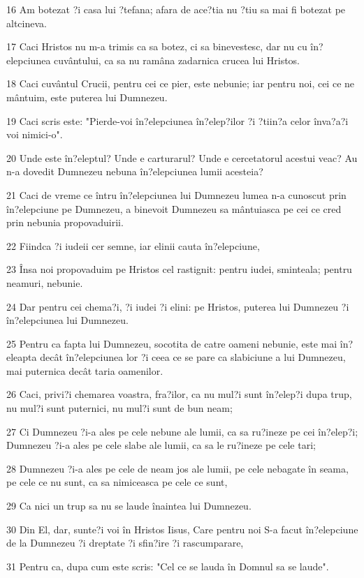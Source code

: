 \par 16 Am botezat ?i casa lui ?tefana; afara de ace?tia nu ?tiu sa mai fi botezat pe altcineva.
\par 17 Caci Hristos nu m-a trimis ca sa botez, ci sa binevestesc, dar nu cu în?elepciunea cuvântului, ca sa nu ramâna zadarnica crucea lui Hristos.
\par 18 Caci cuvântul Crucii, pentru cei ce pier, este nebunie; iar pentru noi, cei ce ne mântuim, este puterea lui Dumnezeu.
\par 19 Caci scris este: "Pierde-voi în?elepciunea în?elep?ilor ?i ?tiin?a celor înva?a?i voi nimici-o".
\par 20 Unde este în?eleptul? Unde e carturarul? Unde e cercetatorul acestui veac? Au n-a dovedit Dumnezeu nebuna în?elepciunea lumii acesteia?
\par 21 Caci de vreme ce întru în?elepciunea lui Dumnezeu lumea n-a cunoscut prin în?elepciune pe Dumnezeu, a binevoit Dumnezeu sa mântuiasca pe cei ce cred prin nebunia propovaduirii.
\par 22 Fiindca ?i iudeii cer semne, iar elinii cauta în?elepciune,
\par 23 Însa noi propovaduim pe Hristos cel rastignit: pentru iudei, sminteala; pentru neamuri, nebunie.
\par 24 Dar pentru cei chema?i, ?i iudei ?i elini: pe Hristos, puterea lui Dumnezeu ?i în?elepciunea lui Dumnezeu.
\par 25 Pentru ca fapta lui Dumnezeu, socotita de catre oameni nebunie, este mai în?eleapta decât în?elepciunea lor ?i ceea ce se pare ca slabiciune a lui Dumnezeu, mai puternica decât taria oamenilor.
\par 26 Caci, privi?i chemarea voastra, fra?ilor, ca nu mul?i sunt în?elep?i dupa trup, nu mul?i sunt puternici, nu mul?i sunt de bun neam;
\par 27 Ci Dumnezeu ?i-a ales pe cele nebune ale lumii, ca sa ru?ineze pe cei în?elep?i; Dumnezeu ?i-a ales pe cele slabe ale lumii, ca sa le ru?ineze pe cele tari;
\par 28 Dumnezeu ?i-a ales pe cele de neam jos ale lumii, pe cele nebagate în seama, pe cele ce nu sunt, ca sa nimiceasca pe cele ce sunt,
\par 29 Ca nici un trup sa nu se laude înaintea lui Dumnezeu.
\par 30 Din El, dar, sunte?i voi în Hristos Iisus, Care pentru noi S-a facut în?elepciune de la Dumnezeu ?i dreptate ?i sfin?ire ?i rascumparare,
\par 31 Pentru ca, dupa cum este scris: "Cel ce se lauda în Domnul sa se laude".


